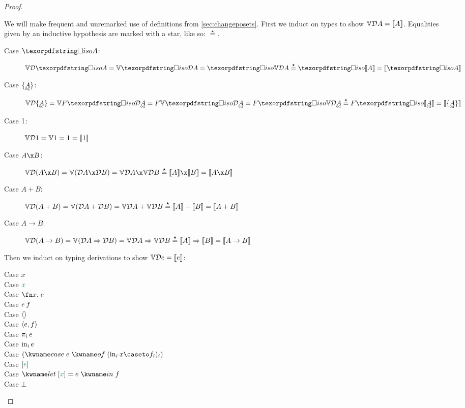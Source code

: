 \documentclass[nomarginums]{rntz}\usepackage[tablet]{fantasy}%
\begin{document}
\thmForget*
\begin{proof}\label{proof:forget}

  We will make frequent and unremarked use of definitions from
  \cref{sec:changeposets}. First we induct on types to show $\mathbb{V}{\mathcal{D} A} =
  \llbracket{A}\rrbracket$. Equalities given by an inductive hypothesis are marked with a star,
  like so: $\stareq$.

  \begin{description}
    \item[Case $\isof A$:] \(\vals{\incdens{\isof A}}
      = \vals{\discof{\incdens A}}
      = \isof{\vals{\incdens A}} \stareq \isof{\den A}
      = \den{\isof A} \)

    \item[Case $\tset{\eqt A}$:]
      \(\vals{\incdens{\tset{\eqt A}}} = \vals{\downof{\discof{\incdens{\eqt A}}}}
      = \downof{\vals{\discof{\incdens{\eqt A}}}}
      = \downof{\isof{\vals{\incdens{\eqt A}}}}
      \stareq \downof{\isof{\den{\eqt A}}}
      = \den{\tset{\eqt A}} \)

    \item[Case $1$:] \(\mathbb{V}{\mathcal{D} 1} = \mathbb{V}1 = 1 = \llbracket{1}\rrbracket\)

    \item[Case $A \x B$:] \(\vals{\incden{A \x B}}
      = \vals{(\incdens A \x \incdens B)}
      = \vals{\incdens A} \x \vals{\incdens B}
      \stareq \den{A} \x \den{B}
      = \den{A \x B} \)

    \item[Case $A + B$:] \(\mathbb{V}{\mathcal{D}({A + B})}
      = \mathbb{V}{(\mathcal{D} A + \mathcal{D} B)}
      = \mathbb{V}{\mathcal{D} A} + \mathbb{V}{\mathcal{D} B}
      \overset{\boldsymbol\star}{=} \llbracket{A}\rrbracket + \llbracket{B}\rrbracket
      = \llbracket{A + B}\rrbracket
      \)

    \item[Case $A \to B$:] \(\mathbb{V}{\mathcal{D}({A \to B})}
      = \mathbb{V}{(\mathcal{D} A \Rightarrow \mathcal{D} B)}
      = \mathbb{V}\mathcal{D} A \Rightarrow \mathbb{V}\mathcal{D} B
      \overset{\boldsymbol\star}{=} \llbracket{A}\rrbracket \Rightarrow \llbracket{B}\rrbracket
      = \llbracket{A \to B}\rrbracket
      \)
  \end{description}

  \noindent
  Then we induct on typing derivations to show $\mathbb{V} \mathcal{D} e = \llbracket{e}\rrbracket$:

  \begin{description}
  \item[Case $x$] \XXX
  \item[Case $\dvar x$] \XXX
  \item[Case $\fnof x e$] \XXX
  \item[Case $e\<f$] \XXX
  \item[Case $\langle{}\rangle$] \XXX
  \item[Case $\langle{e,f}\rangle$] \XXX
  \item[Case $\pi_i\<e$] \XXX
  \item[Case $\mathrm{in}_{i}\, e$] \XXX
  \item[Case $(\ecase{e} (\inj i x \caseto f_i)_i)$] \XXX
  \item[Case $\eboxd e$] \XXX
  \item[Case $\elet{\eboxd x = e} f$] \XXX
  \item[Case $\bot$] \XXX


\end{description}
\end{proof}
\end{document}
